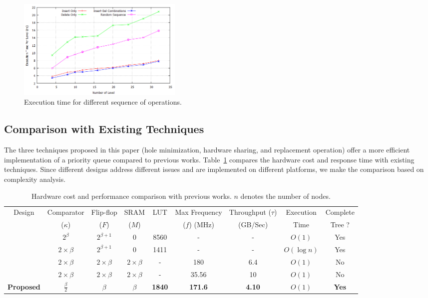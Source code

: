 \documentclass[10pt, conference, compsocconf]{IEEEtran}
\begin{document}
\begin{figure}[!ht]
  \centering
  \includegraphics[width=8.0cm]{Figures/random.png}
      \caption{Execution time for different sequence of operations.}
    \label{random}
\end{figure}

\subsection{Comparison with Existing Techniques}

The three techniques proposed in this paper (hole minimization, hardware sharing, and replacement operation) offer a more efficient implementation of a priority queue compared to previous works.
Table~\ref{table4} compares the hardware cost and response time with existing techniques.
Since different designs address different issues and are implemented on different platforms, we make the comparison based on complexity analysis.

\begin{table}
 \begin{center}
 \caption{Hardware cost and performance comparison with previous works. $n$ denotes the number of nodes.}
\label{table4}
\begin{tabular}{ |c|c|c|c|c|c|c|c|c| }
 \hline
 Design  & Comparator  & Flip-flop & SRAM & LUT &Max Frequency & Throughput ($\tau$) & Execution & Complete \\
  & ($\kappa$)& ($F$)& ($M$) &  & ($f$) (MHz) & (GB/Sec) & Time & Tree ?\\
 \hline
 \hline
 \cite{hw8} & $2^\beta$ & $2^{\beta +1}$& 0 & 8560 & - & - & $O(1)$ & Yes\\
 \hline
 \cite{hw11} & $2 \times \beta$ & $2^{\beta +1}$ & 0 & 1411 & - & - & $O(\log n)$ & Yes\\
 \hline
 \cite{fpga1} & $2 \times \beta$ & $2 \times \beta$ & $2 \times \beta$ & - & 180 &6.4 & $O(1)$ & No\\
 \hline
 \cite{hw2} & $2 \times \beta$ & $2 \times \beta$ & $2 \times \beta$ & - & 35.56 &10 & $O(1)$ & No\\
 \hline
{\bf Proposed} & {\bf $\frac{\beta}{2}$} & {\bf $\beta$} & {\bf $\beta$} & {\bf 1840} & {\bf 171.6} & {\bf 4.10} & {\bf $O(1)$} & {\bf Yes}\\
 \hline
\end{tabular}
\end{center}
\end{table}
\end{document}
